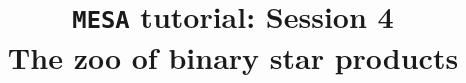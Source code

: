 \documentclass[11pt,a4paper]{article}
\begin{document}
\title{
    \textbf{\texttt{MESA} tutorial: Session 4} \\
    \textbf{\Large The zoo of binary star products}
}
\date{}
\maketitle
\vspace{-1cm}

\noindent




\end{document}
